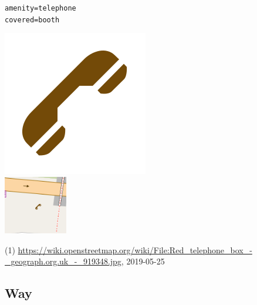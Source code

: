 \documentclass{beamer}
\begin{document}
\begin{frame}
\begin{center}
\begin{minipage}[b][0.6\textheight][c]{0.4\linewidth}
			\end{minipage}
			\begin{minipage}[b][0.6\textheight][c]{0.3\linewidth}
				\texttt{amenity=telephone}\\
				\texttt{covered=booth}
				\begin{center}
					\includegraphics[width=0.3\linewidth,height=0.3\textheight,keepaspectratio]{images/240px-Telephone.png}\\
					\vspace{0.25cm}
					\includegraphics[width=0.8\linewidth,height=0.8\textheight,keepaspectratio]{images/telephone.png}
				\end{center}
			\end{minipage}
		\end{center}
		{\tiny (1) \url{https://wiki.openstreetmap.org/wiki/File:Red_telephone_box_-_geograph.org.uk_-_919348.jpg}, 2019-05-25}
	\end{frame}
		
	\subsection{Way}
	
\end{document}
